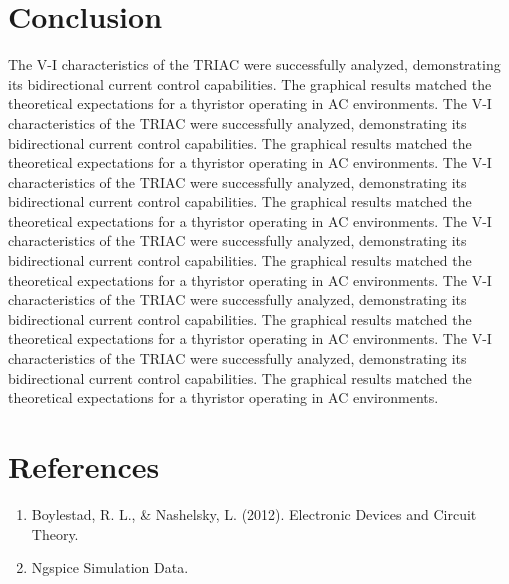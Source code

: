 \documentclass[12pt,a4paper]{article}
\begin{document}
\section{Conclusion}
The V-I characteristics of the TRIAC were successfully analyzed, demonstrating its bidirectional current control capabilities. The graphical results matched the theoretical expectations for a thyristor operating in AC environments. The V-I characteristics of the TRIAC were successfully analyzed, demonstrating its bidirectional current control capabilities. The graphical results matched the theoretical expectations for a thyristor operating in AC environments. The V-I characteristics of the TRIAC were successfully analyzed, demonstrating its bidirectional current control capabilities. The graphical results matched the theoretical expectations for a thyristor operating in AC environments. The V-I characteristics of the TRIAC were successfully analyzed, demonstrating its bidirectional current control capabilities. The graphical results matched the theoretical expectations for a thyristor operating in AC environments. The V-I characteristics of the TRIAC were successfully analyzed, demonstrating its bidirectional current control capabilities. The graphical results matched the theoretical expectations for a thyristor operating in AC environments. The V-I characteristics of the TRIAC were successfully analyzed, demonstrating its bidirectional current control capabilities. The graphical results matched the theoretical expectations for a thyristor operating in AC environments. 

\section{References}
\begin{enumerate}

    \item Boylestad, R. L., \& Nashelsky, L. (2012). Electronic Devices and Circuit Theory.

    \item Ngspice Simulation Data.

\end{enumerate}
\end{document}
